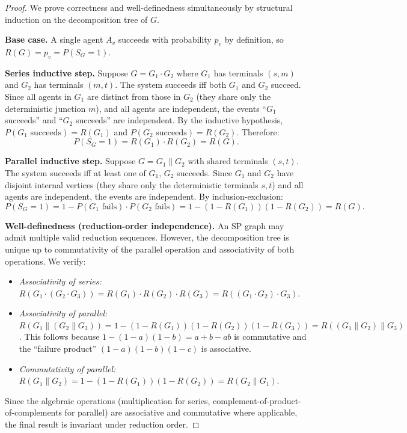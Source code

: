 \begin{proof}
We prove correctness and well-definedness simultaneously by structural induction
on the decomposition tree of $G$.

\medskip\noindent
\textbf{Base case.}  A single agent $A_v$ succeeds with probability $p_v$ by
definition, so $R(G) = p_v = P(S_G = 1)$.

\medskip\noindent
\textbf{Series inductive step.}  Suppose $G = G_1 \cdot G_2$ where $G_1$ has
terminals $(s, m)$ and $G_2$ has terminals $(m, t)$.  The system succeeds iff both
$G_1$ and $G_2$ succeed.  Since all agents in $G_1$ are distinct from those in $G_2$
(they share only the deterministic junction $m$), and all agents are independent,
the events ``$G_1$ succeeds'' and ``$G_2$ succeeds'' are independent.  By the
inductive hypothesis, $P(G_1 \text{ succeeds}) = R(G_1)$ and
$P(G_2 \text{ succeeds}) = R(G_2)$.  Therefore:
\[
  P(S_G = 1) = R(G_1) \cdot R(G_2) = R(G).
\]

\medskip\noindent
\textbf{Parallel inductive step.}  Suppose $G = G_1 \| G_2$ with shared terminals
$(s, t)$.  The system succeeds iff at least one of $G_1$, $G_2$ succeeds.  Since
$G_1$ and $G_2$ have disjoint internal vertices (they share only the deterministic
terminals $s, t$) and all agents are independent, the events are independent.
By inclusion-exclusion:
\[
  P(S_G = 1) = 1 - P(G_1 \text{ fails}) \cdot P(G_2 \text{ fails})
  = 1 - (1 - R(G_1))(1 - R(G_2)) = R(G).
\]

\medskip\noindent
\textbf{Well-definedness (reduction-order independence).}
An SP graph may admit multiple valid reduction sequences.  However, the
decomposition tree is unique up to commutativity of the parallel operation and
associativity of both operations.  We verify:
\begin{itemize}
  \item \emph{Associativity of series:}
    $R(G_1 \cdot (G_2 \cdot G_3)) = R(G_1) \cdot R(G_2) \cdot R(G_3)
    = R((G_1 \cdot G_2) \cdot G_3)$.
  \item \emph{Associativity of parallel:}
    $R(G_1 \| (G_2 \| G_3)) = 1 - (1-R(G_1))(1-R(G_2))(1-R(G_3))
    = R((G_1 \| G_2) \| G_3)$.
    This follows because $1 - (1-a)(1-b) = a + b - ab$ is commutative and
    the ``failure product'' $(1-a)(1-b)(1-c)$ is associative.
  \item \emph{Commutativity of parallel:}
    $R(G_1 \| G_2) = 1 - (1-R(G_1))(1-R(G_2)) = R(G_2 \| G_1)$.
\end{itemize}
Since the algebraic operations (multiplication for series, complement-of-product-of-complements for parallel) are associative and commutative where applicable,
the final result is invariant under reduction order.
\end{proof}

